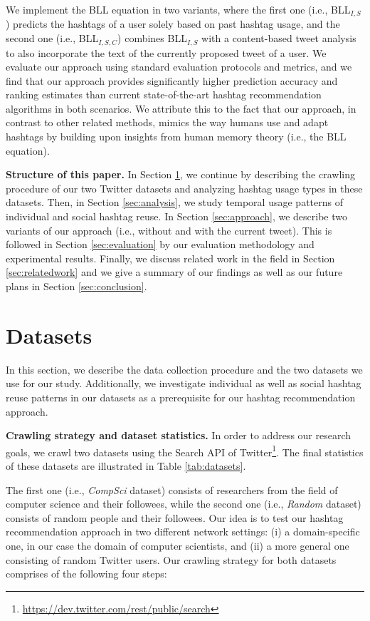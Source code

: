 \documentclass{sig-alternate-05-2015}
\newcommand{\para}[1]{\vspace{2mm}\noindent\textbf{#1}}
\begin{document}
We implement the BLL equation in two variants, where the first one (i.e., BLL$_{I,S}${}) predicts the hashtags of a user solely based on past hashtag usage, and the second one (i.e., BLL$_{I,S,C}${}) combines BLL$_{I,S}${} with a content-based tweet analysis to also incorporate the text of the currently proposed tweet of a user. We evaluate our approach using standard evaluation protocols and metrics, and we find that our approach provides significantly higher prediction accuracy and ranking estimates than current state-of-the-art hashtag recommendation algorithms in both scenarios. We attribute this to the fact that our approach, in contrast to other related methods, mimics the way humans use and adapt hashtags by building upon insights from human memory theory (i.e., the BLL equation).

\para{Structure of this paper.} In Section \ref{sec:datasets}, we continue by describing the crawling procedure of our two Twitter datasets and analyzing hashtag usage types in these datasets. Then, in Section \ref{sec:analysis}, we study temporal usage patterns of individual and social hashtag reuse. In Section \ref{sec:approach}, we describe two variants of our approach (i.e., without and with the current tweet). This is followed in Section \ref{sec:evaluation} by our evaluation methodology and experimental results. Finally, we discuss related work in the field in Section \ref{sec:relatedwork} and we give a summary of our findings as well as our future plans in Section \ref{sec:conclusion}.





\section{Datasets} \label{sec:datasets}
In this section, we describe the data collection procedure and the two datasets we use for our study. Additionally, we investigate individual as well as social hashtag reuse patterns in our datasets as a prerequisite for our hashtag recommendation approach.

\para{Crawling strategy and dataset statistics.} In order to address our research goals, we crawl two datasets using the Search API of Twitter\footnote{\url{https://dev.twitter.com/rest/public/search}}. The final statistics of these datasets are illustrated in Table \ref{tab:datasets}.

The first one (i.e., \textit{CompSci}{} dataset) consists of researchers from the field of computer science and their followees, while the second one (i.e., \textit{Random}{} dataset) consists of random people and their followees. Our idea is to test our hashtag recommendation approach in two different network settings: (i) a domain-specific one, in our case the domain of computer scientists, and (ii) a more general one consisting of random Twitter users. Our crawling strategy for both datasets comprises of the following four steps:
\end{document}
